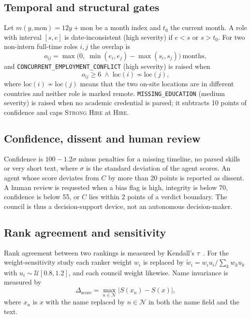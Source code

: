 \documentclass[conference]{IEEEtran}
\newcommand{\verd}[1]{\textsc{#1}}
\newcommand{\flag}[1]{\texttt{\footnotesize #1}}
\newcommand{\Sstrong}{\verd{Strong Hire}}
\newcommand{\Shire}{\verd{Hire}}
\begin{document}
\subsection{Temporal and structural gates}
\label{sec:gates}
Let $m(y,\mathrm{mon})=12y+\mathrm{mon}$ be a month index and $t_0$ the current month. A role with interval $[s,e]$ is date-inconsistent (high severity) if $e<s$ or $s>t_0$. For two non-intern full-time roles $i,j$ the overlap is
\begin{equation}
o_{ij}=\max\bigl(0,\;\min(e_i,e_j)-\max(s_i,s_j)\bigr)\ \text{months},
\end{equation}
and \flag{CONCURRENT\_EMPLOYMENT\_CONFLICT} (high severity) is raised when
\begin{equation}
o_{ij}\ge 6\;\wedge\;\mathrm{loc}(i)\not\sim \mathrm{loc}(j),
\label{eq:concurrent}
\end{equation}
where $\mathrm{loc}(i)\not\sim\mathrm{loc}(j)$ means that the two on-site locations are in different countries and neither role is marked remote. \flag{MISSING\_EDUCATION} (medium severity) is raised when no academic credential is parsed; it subtracts 10 points of confidence and caps \Sstrong{} at \Shire{}.

\subsection{Confidence, dissent and human review}
Confidence is $100-1.2\sigma$ minus penalties for a missing timeline, no parsed skills or very short text, where $\sigma$ is the standard deviation of the agent scores. An agent whose score deviates from $C$ by more than 20 points is reported as dissent. A human review is requested when a bias flag is high, integrity is below 70, confidence is below 55, or $C$ lies within 2 points of a verdict boundary. The council is thus a decision-support device, not an autonomous decision-maker.

\subsection{Rank agreement and sensitivity}
Rank agreement between two rankings is measured by Kendall's $\tau$~\cite{kendall}. For the weight-sensitivity study each ranker weight $w_i$ is replaced by $\tilde w_i=w_i u_i/\sum_k w_k u_k$ with $u_i\sim\mathcal U[0.8,1.2]$, and each council weight likewise. Name invariance is measured by
\begin{equation}
\Delta_{\mathrm{score}}=\max_{n\in\mathcal N}\bigl|S(x_n)-S(x)\bigr|,
\end{equation}
where $x_n$ is $x$ with the name replaced by $n\in\mathcal N$ in both the name field and the text.
\end{document}
